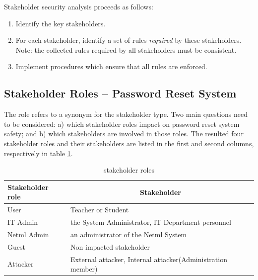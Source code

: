  Stakeholder security analysis proceeds as follows: 
\begin{enumerate}[1.]
\item Identify the key stakeholders.
\item For each stakeholder, identify a set of rules {\em required}
by these stakeholders. Note: the collected rules required
by all stakeholders must be consistent.
\item Implement procedures which ensure that all rules are enforced.
\end{enumerate}




\subsection{Stakeholder Roles -- Password Reset System}\label{Stakeholder Role}

The role refers to a synonym for the stakeholder type. Two main questions
need to be considered: a) which stakeholder roles impact on password
reset system safety; and b) which stakeholders are involved in those
roles. The  resulted four stakeholder roles and their stakeholders
are listed in the first and second columns, respectively in table
\ref{Stkroles}.

 \begin{table}[!htbp]	      %
	\begin{center}
\begin{tabular}{|l|p{5.5cm}|} \hline
 \textbf{Stakeholder role} & \multicolumn{1}{|c|}{\textbf{Stakeholder}} \\
\hline
 User & Teacher or Student \\
\hline
 IT Admin &  the System Administrator, IT Department personnel \\
\hline
 Netml Admin &  an administrator of the Netml System \\
\hline Guest & Non impacted stakeholder \\
\hline
 Attacker & External attacker, Internal attacker(Administration member) \\
\hline
	\end{tabular} \end{center} \caption{ stakeholder roles }
\label{Stkroles} \end{table}

